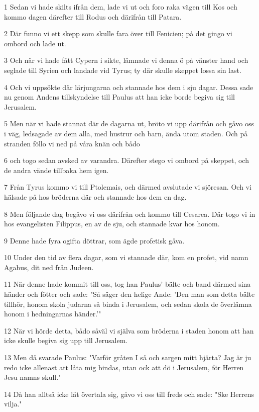 \par 1 Sedan vi hade skilts ifrån dem, lade vi ut och foro raka vägen till Kos och kommo dagen därefter till Rodus och därifrån till Patara.
\par 2 Där funno vi ett skepp som skulle fara över till Fenicien; på det gingo vi ombord och lade ut.
\par 3 Och när vi hade fått Cypern i sikte, lämnade vi denna ö på vänster hand och seglade till Syrien och landade vid Tyrus; ty där skulle skeppet lossa sin last.
\par 4 Och vi uppsökte där lärjungarna och stannade hos dem i sju dagar. Dessa sade nu genom Andens tillskyndelse till Paulus att han icke borde begiva sig till Jerusalem.
\par 5 Men när vi hade stannat där de dagarna ut, bröto vi upp därifrån och gåvo oss i väg, ledsagade av dem alla, med hustrur och barn, ända utom staden. Och på stranden föllo vi ned på våra knän och bådo
\par 6 och togo sedan avsked av varandra. Därefter stego vi ombord på skeppet, och de andra vände tillbaka hem igen.
\par 7 Från Tyrus kommo vi till Ptolemais, och därmed avslutade vi sjöresan. Och vi hälsade på hos bröderna där och stannade hos dem en dag.
\par 8 Men följande dag begåvo vi oss därifrån och kommo till Cesarea. Där togo vi in hos evangelisten Filippus, en av de sju, och stannade kvar hos honom.
\par 9 Denne hade fyra ogifta döttrar, som ägde profetisk gåva.
\par 10 Under den tid av flera dagar, som vi stannade där, kom en profet, vid namn Agabus, dit ned från Judeen.
\par 11 När denne hade kommit till oss, tog han Paulus' bälte och band därmed sina händer och fötter och sade: "Så säger den helige Ande: 'Den man som detta bälte tillhör, honom skola judarna så binda i Jerusalem, och sedan skola de överlämna honom i hedningarnas händer.'"
\par 12 När vi hörde detta, bådo såväl vi själva som bröderna i staden honom att han icke skulle begiva sig upp till Jerusalem.
\par 13 Men då svarade Paulus: "Varför gråten I så och sargen mitt hjärta? Jag är ju redo icke allenast att låta mig bindas, utan ock att dö i Jerusalem, för Herren Jesu namns skull."
\par 14 Då han alltså icke lät övertala sig, gåvo vi oss till freds och sade: "Ske Herrens vilja."
